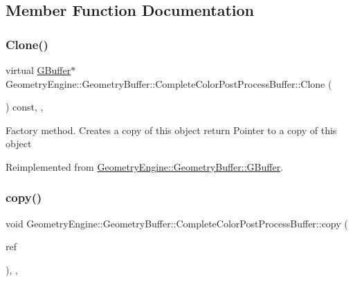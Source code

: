 \subsection{Member Function Documentation}
\mbox{\label{class_geometry_engine_1_1_geometry_buffer_1_1_complete_color_post_process_buffer_a8a484d5196bba7b92f31e500229743bc}} 
\subsubsection{\texorpdfstring{Clone()}{Clone()}}
{\footnotesize\ttfamily virtual \mbox{\hyperlink{class_geometry_engine_1_1_geometry_buffer_1_1_g_buffer}{G\+Buffer}}$\ast$ Geometry\+Engine\+::\+Geometry\+Buffer\+::\+Complete\+Color\+Post\+Process\+Buffer\+::\+Clone (\begin{DoxyParamCaption}{ }\end{DoxyParamCaption}) const\hspace{0.3cm}{\ttfamily [inline]}, {\ttfamily [override]}, {\ttfamily [virtual]}}

Factory method. Creates a copy of this object return Pointer to a copy of this object 

Reimplemented from \mbox{\hyperlink{class_geometry_engine_1_1_geometry_buffer_1_1_g_buffer_af993f8c23f7e78051f3071be4873af9d}{Geometry\+Engine\+::\+Geometry\+Buffer\+::\+G\+Buffer}}.

\mbox{\label{class_geometry_engine_1_1_geometry_buffer_1_1_complete_color_post_process_buffer_ac7d1a90658b1a2f59674b76685e8b052}} 
\subsubsection{\texorpdfstring{copy()}{copy()}}
{\footnotesize\ttfamily void Geometry\+Engine\+::\+Geometry\+Buffer\+::\+Complete\+Color\+Post\+Process\+Buffer\+::copy (\begin{DoxyParamCaption}\item[{const \mbox{\hyperlink{class_geometry_engine_1_1_geometry_buffer_1_1_g_buffer}{G\+Buffer}} \&}]{ref }\end{DoxyParamCaption})\hspace{0.3cm}{\ttfamily [override]}, {\ttfamily [protected]}, {\ttfamily [virtual]}}

